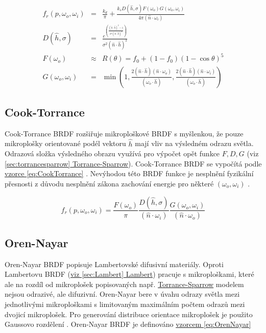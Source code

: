 \documentclass[czech,master]{diploma}
\newcommand{\uvec}[1]{\hat{#1}}
\newcommand{\point}{p}
\newcommand{\brdf}{f_r\left(\point,\omega_{o},\omega_{i}\right)}
\newcommand{\normVec}{\uvec{n}}
\newcommand{\inVec}{\omega_{i}}
\newcommand{\outVec}{\omega_{o}}
\newcommand{\halfVec}{\uvec{h}}
\newcommand{\rough}{\sigma}
\newcommand{\ior}{f_0}
\begin{document}
\begin{eqnarray}
  \brdf & = & \frac{k_d}{\pi} + \frac{k_s D(\halfVec,\rough) F(\outVec) G(\outVec,\inVec)}{4\pi (\normVec \cdot \inVec)}\label{eq:TorranceSparrow}\\
  D(\halfVec,\rough) & = & \frac{e^{\left(\frac{(\normVec\cdot \halfVec)^2-1}{\rough^2(\normVec \cdot \halfVec)^2}\right)}}{\rough^2(\normVec\cdot \halfVec)^2}\label{eq:beckDistr}\\
  F(\outVec) & \approx & R(\theta) = \ior + (1-\ior)(1-\cos\theta)^5\label{eq:schlickFresnel}\\
  G(\outVec,\inVec) & = & \min \left( 1, \frac{2 ( \normVec \cdot \halfVec ) ( \normVec \cdot \outVec )
    }{ ( \outVec \cdot \halfVec ) },\frac{ 2 ( \normVec \cdot \halfVec ) ( \normVec \cdot \inVec ) }{ ( \outVec \cdot \halfVec ) } \right) \label{eq:geomAtatenuation}
\end{eqnarray}
\subsection{Cook-Torrance}
Cook-Torrance BRDF rozšiřuje mikroploškové BRDF s myšlenkou, že pouze mikroplošky orientované podél vektoru \(\halfVec\) mají vliv na výsledném odrazu světla. Odrazová složka výsledného obrazu využívá pro výpočet opět funkce \(F, D, G\) (viz \hyperref[sec:torrancesparrow]{\ref{sec:torrancesparrow} Torrance-Sparrow}). Cook-Torrance BRDF se vypočítá podle \hyperref[eq:CookTorrance]{vzorce \ref{eq:CookTorrance}} \cite{CookTorranceBRDF}. Nevýhodou této BRDF funkce je nesplnění fyzikální přesnosti z důvodu nesplnění zákona zachování energie pro některé \(\left(\outVec,\inVec\right)\) \cite{BRDFOverview}.

\begin{equation} \label{eq:CookTorrance}
  \brdf  = \frac{F(\outVec)}{\pi} \frac{D(\halfVec,\rough)}{(\normVec\cdot\inVec)} \frac{G(\outVec,\inVec)}{(\normVec\cdot\outVec)}
\end{equation}

\subsection{Oren-Nayar}
Oren-Nayar BRDF popisuje Lambertovské difusivní materiály. Oproti Lambertovu BRDF (\hyperref[sec:Lambert]{viz \ref{sec:Lambert} Lambert}) pracuje s mikroploškami, které ale na rozdíl od mikroplošek popisovaných např. \hyperref[sec:torrancesparrow]{Torrance-Sparrow} modelem nejsou odrazivé, ale difuzivní. Oren-Nayar bere v úvahu odrazy světla mezi jednotlivými mikroploškami s limitovaným maximálním počtem odrazů mezi dvojicí mikroplošek. Pro generování distribuce orientace mikroplošek je použito Gaussovo rozdělení \cite{OrenNayar} \cite{BRDFOverview}. Oren-Nayar BRDF je definováno \hyperref[eq:OrenNayar]{vzorcem \ref{eq:OrenNayar}}
\end{document}
